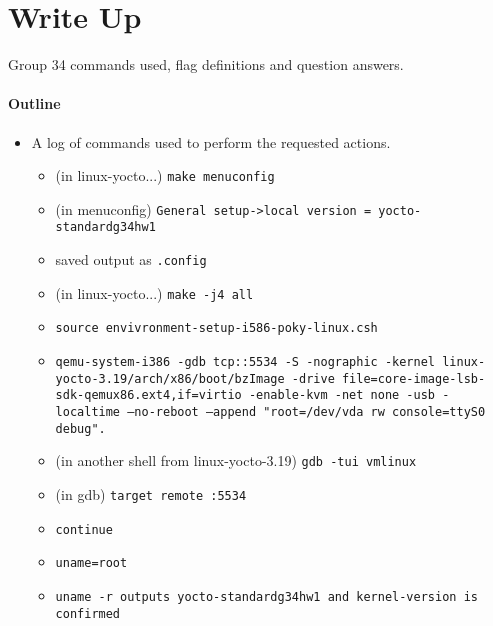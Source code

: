 \documentclass[titlepage]{article}
\begin{document}
\maketitle

\section*{Write Up}
Group 34 commands used, flag definitions and question answers.

\paragraph{Outline}

\begin{itemize}
  \item A log of commands used to perform the requested actions.
  \begin{itemize}
    \item (in linux-yocto...) \texttt{make menuconfig}
    \item (in menuconfig) \texttt{General setup->local version = yocto-standardg34hw1}
    \item saved output as \texttt{.config}
    \item (in linux-yocto...) \texttt{make -j4 all}
    \item \texttt{source envivronment-setup-i586-poky-linux.csh}
    \item \texttt{qemu-system-i386 -gdb tcp::5534 -S -nographic -kernel linux-yocto-3.19/arch/x86/boot/bzImage -drive file=core-image-lsb-sdk-qemux86.ext4,if=virtio -enable-kvm -net none -usb -localtime --no-reboot --append "root=/dev/vda rw console=ttyS0 debug".}
    \item (in another shell from linux-yocto-3.19) \texttt{gdb -tui vmlinux}
    \item (in gdb) \texttt{target remote :5534}
    \item \texttt{continue}
    \item \texttt{uname=root}
    \item \texttt{uname -r outputs yocto-standardg34hw1 and kernel-version is confirmed}


\end{itemize}
\end{itemize}
\end{document}
